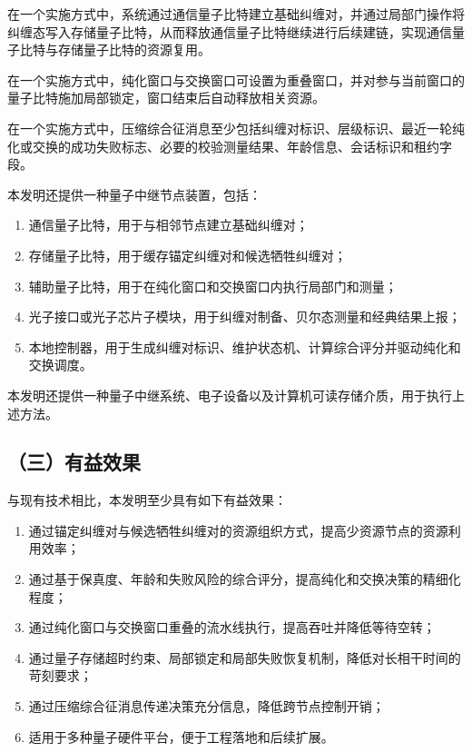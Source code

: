 \documentclass[12pt,a4paper]{article}
\begin{document}
在一个实施方式中，系统通过通信量子比特建立基础纠缠对，并通过局部门操作将纠缠态写入存储量子比特，从而释放通信量子比特继续进行后续建链，实现通信量子比特与存储量子比特的资源复用。

在一个实施方式中，纯化窗口与交换窗口可设置为重叠窗口，并对参与当前窗口的量子比特施加局部锁定，窗口结束后自动释放相关资源。

在一个实施方式中，压缩综合征消息至少包括纠缠对标识、层级标识、最近一轮纯化或交换的成功失败标志、必要的校验测量结果、年龄信息、会话标识和租约字段。

本发明还提供一种量子中继节点装置，包括：
\begin{enumerate}[leftmargin=2em]
    \item 通信量子比特，用于与相邻节点建立基础纠缠对；
    \item 存储量子比特，用于缓存锚定纠缠对和候选牺牲纠缠对；
    \item 辅助量子比特，用于在纯化窗口和交换窗口内执行局部门和测量；
    \item 光子接口或光子芯片子模块，用于纠缠对制备、贝尔态测量和经典结果上报；
    \item 本地控制器，用于生成纠缠对标识、维护状态机、计算综合评分并驱动纯化和交换调度。
\end{enumerate}

本发明还提供一种量子中继系统、电子设备以及计算机可读存储介质，用于执行上述方法。

\subsection*{（三）有益效果}

与现有技术相比，本发明至少具有如下有益效果：
\begin{enumerate}[leftmargin=2em]
    \item 通过锚定纠缠对与候选牺牲纠缠对的资源组织方式，提高少资源节点的资源利用效率；
    \item 通过基于保真度、年龄和失败风险的综合评分，提高纯化和交换决策的精细化程度；
    \item 通过纯化窗口与交换窗口重叠的流水线执行，提高吞吐并降低等待空转；
    \item 通过量子存储超时约束、局部锁定和局部失败恢复机制，降低对长相干时间的苛刻要求；
    \item 通过压缩综合征消息传递决策充分信息，降低跨节点控制开销；
    \item 适用于多种量子硬件平台，便于工程落地和后续扩展。
\end{enumerate}
\end{document}
